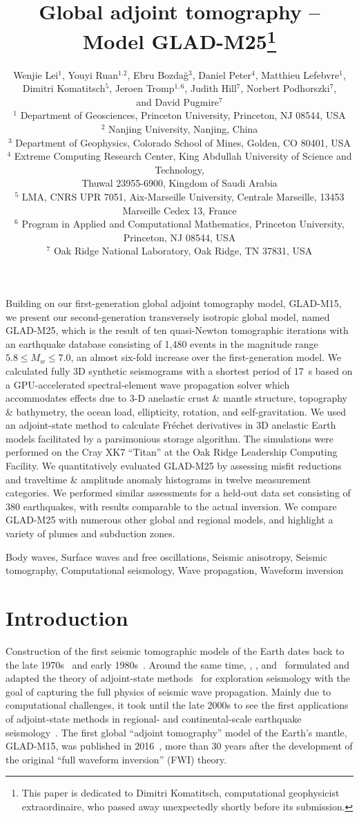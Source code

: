 \documentclass[extra,mreferee]{gji}
\title[Global Adjoint Tomography -- Model GLAD-M25]
  {Global adjoint tomography -- Model GLAD-M25\footnote{This paper is dedicated to Dimitri Komatitsch, computational geophysicist extraordinaire, who passed away unexpectedly shortly before its submission.}}
\author[Lei et al.]
  {Wenjie Lei$^1$, Youyi Ruan$^{1.2}$, Ebru Bozda\u g$^3$, Daniel Peter$^4$, Matthieu Lefebvre$^1$, \\{\LARGE \rm Dimitri Komatitsch$^5$, Jeroen Tromp$^{1,6}$, Judith Hill$^7$, Norbert Podhorszki$^7$}, \\ {\LARGE \rm and David Pugmire$^7$} \\
  $^1$ Department of Geosciences, Princeton University, Princeton, NJ 08544, USA\\
  $^2$ Nanjing University, Nanjing, China\\
  $^3$ Department of Geophysics, Colorado School of Mines, Golden, CO 80401, USA\\
  $^4$ Extreme Computing Research Center, King Abdullah University of Science and Technology, \\Thuwal 23955-6900, Kingdom of Saudi Arabia\\
  $^5$ LMA, CNRS UPR 7051, Aix-Marseille University, Centrale Marseille, 13453 Marseille Cedex 13, France\\
  $^6$ Program in Applied and Computational Mathematics, Princeton University, Princeton, NJ 08544, USA\\
  $^7$ Oak Ridge National Laboratory, Oak Ridge, TN 37831, USA\\
  }
\begin{document}
\maketitle

%
%
\begin{summary}
Building on our first-generation global adjoint tomography model,
GLAD-M15, we present our second-generation transversely isotropic global model,
named GLAD-M25, which is the result of ten quasi-Newton tomographic iterations with an
earthquake database consisting of 1,480 events in the magnitude range $5.8\le M_w \le 7.0$,
an almost six-fold increase over the first-generation model.
We calculated fully 3D synthetic seismograms with a shortest period of 17~s based on a GPU-accelerated spectral-element wave
propagation solver which accommodates effects due to 3-D anelastic crust \& mantle structure, topography \& bathymetry, the ocean load, ellipticity, rotation, and self-gravitation.
We used an adjoint-state method to calculate Fr\'echet derivatives in 3D anelastic Earth models
facilitated by a parsimonious storage algorithm.
The simulations were performed on the Cray XK7 ``Titan'' at the Oak Ridge Leadership Computing Facility.
We quantitatively evaluated GLAD-M25 by assessing misfit reductions and traveltime \& amplitude anomaly histograms in twelve measurement
categories.
We performed similar assessments for a held-out data set consisting of 380 earthquakes,
with results comparable to the actual inversion.
We compare GLAD-M25 with numerous other global and regional models,
and highlight a variety of plumes and subduction zones.
\end{summary}

\begin{keywords}
Body waves, Surface waves and free oscillations, Seismic anisotropy, Seismic tomography, Computational seismology, Wave propagation, Waveform inversion
\end{keywords}

\section{Introduction}

Construction of the first seismic tomographic models of the Earth dates back to the late 1970s~\citep{Aki77,Dziewonski77,SenTok77} and early 1980s~\citep[e.g.,][]{WD84,Nataf1984}.
Around the same time,
\cite{BaChLa77}, \cite{Lailly1983}, and~\cite{Tar84} formulated and adapted the theory of adjoint-state methods~\citep{Chavent1974} for exploration seismology with the goal of capturing the full physics of seismic wave propagation.
Mainly due to computational challenges,
it took until the late 2000s to see the first applications of adjoint-state methods in regional- and continental-scale earthquake seismology~\citep{tape2009adjoint,Fichtner09,zhu2012structure}.
The first global ``adjoint tomography'' model of the Earth's mantle,
GLAD-M15, was published in 2016~\citep{bozdaug2016global}, more than 30 years after the development of the original ``full waveform inversion'' (FWI) theory.
\end{document}
